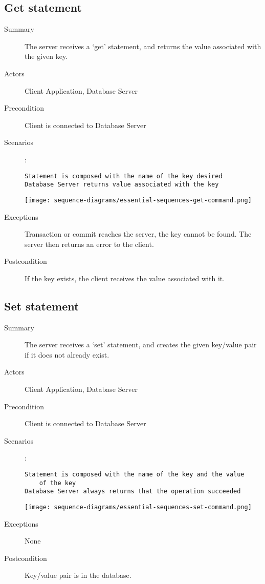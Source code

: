 \documentclass[a4paper]{report}
\begin{document}
	\pagebreak
	
	\subsection{Get statement}

	\begin{description}
		\item[Summary] The server receives a ‘get’ statement, and returns the value associated with the given key.
		\item[Actors] Client Application, Database Server
		\item[Precondition] Client is connected to Database Server
		\item[Scenarios] :

		\begin{lstlisting}
Statement is composed with the name of the key desired
Database Server returns value associated with the key
		\end{lstlisting}

		\begin{center}
			\texttt{[image: sequence-diagrams/essential-sequences-get-command.png]}
		\end{center}

		\item[Exceptions] Transaction or commit reaches the server, the key cannot be found. The server then returns an error to the client.

		\item[Postcondition] If the key exists, the client receives the value associated with it.
	\end{description}

	\pagebreak
	
	\subsection{Set statement}

	\begin{description}
		\item[Summary] The server receives a ‘set’ statement, and creates the given key/value pair if it does not already exist.
		\item[Actors] Client Application, Database Server
		\item[Precondition] Client is connected to Database Server
		\item[Scenarios] :

		\begin{lstlisting}
Statement is composed with the name of the key and the value
	of the key
Database Server always returns that the operation succeeded
		\end{lstlisting}

		\begin{center}
			\texttt{[image: sequence-diagrams/essential-sequences-set-command.png]}
		\end{center}

		\item[Exceptions] None
		\item[Postcondition] Key/value pair is in the database.
	\end{description}
	
\end{document}
